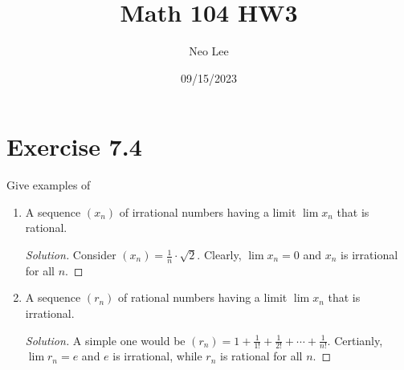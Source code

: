 \documentclass{article}
\title{Math 104 HW3}
\author{Neo Lee}
\date{09/15/2023}
\begin{document}
 

\maketitle 
\section*{Exercise 7.4}
Give examples of 
\begin{enumerate}[label=(\alph*)]
    \item A sequence $(x_n)$ of irrational numbers having a limit $\lim x_n$ that is rational.
    \begin{proof}[Solution]
        Consider $(x_n) = \frac{1}{n}\cdot\sqrt{2}$. Clearly, $\lim x_n = 0$ and $x_n$ is 
        irrational for all $n$.
    \end{proof}
    \item A sequence $(r_n)$ of rational numbers having a limit $\lim x_n$ that is irrational.
    \begin{proof}[Solution]
        A simple one would be $(r_n) = 1 + \frac{1}{1!} + \frac{1}{2!} + \cdots + \frac{1}{n!}$.
        Certianly, $\lim r_n = e$ and $e$ is irrational, while $r_n$ is rational for all $n$.
    \end{proof}
\end{enumerate}
\end{document}
